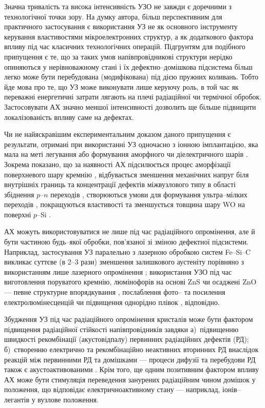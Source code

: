 Значна тривалість та висока інтенсивність УЗО не завжди є доречними з технологічної точки зору.
На думку автора, більш перспективним для практичного застосування є використання УЗ не як основного інструменту керування властивостями мікроелектронних структур, а як додаткового фактора впливу під час класичних технологічних операцій.
Підгрунтям для подібного припущення є те, що за таких умов напівпровідникові структури нерідко опиняються у нерівноважному стані і їх дефектно--домішкова підсистема більш легко може бути перебудована (модифікована) під дією пружних коливань.
Тобто йде мова про те, що УЗ може виконувати лише керуючу роль, в той час як переважні енергетичні затрати
лягають на плечі радіаційної чи термічної обробок.
Застосовувати АХ значно меншої інтенсивності дозволить ще більше підвищити локалізованість впливу саме на дефектах.

Чи не найяскравішим експериментальним доказом даного припущення є результати, отримані при
використанні УЗ одночасно з іонною імплантацією, яка мала на меті легування або формування аморфного чи діелектричного шарів \cite{US:ImplantUFJ2015,US:ImplantUFJ2001,US:ImplantUFJ2008,ROMANYUK2005,Roman2006,RomanyukSST,
YOlikh2005,ROMANJUK2005MatSci,USImplant:JVacSci}.
Зокрема показано, що за наявності АХ
підсилюється процес аморфізації поверхневого шару кремнію \cite{RomanyukSST,US:ImplantUFJ2001},
відбувається зменшення механічних напруг біля внутрішніх границь \cite{US:ImplantUFJ2008,ROMANJUK2005MatSci}
та концентрації дефектів міжвузлового типу в області збіднення $p$--$n$ переходів \cite{YOlikh2005},
створюються умови для формування ультра--мілких переходів \cite{USImplant:JVacSci},
покращуються властивості та зменшується товщина шару WO на поверхні $p$--Si \cite{ROMANYUK2005,Roman2006}.

АХ можуть використовуватися не лише під час радіаційного опромінення, але й бути частиною будь--якої обробки, пов'язаної зі зміною дефектної підсистеми.
Наприклад, застосування УЗ паралельно з лазерною обробкою систем Fe--Si--C викликає суттєве (в 2--3 рази) зменшення залишкового аустеніту порівняно з використанням лише лазерного опромінення \cite{US:FeSiC};
використання УЗО під час виготовлення поруватого кремнію, люмінофорів на основі ZnS чи осаджені ZnO --- певне структурне впорядкування \cite{Kalem2000}, послаблення фото-- та посилення електролюмінесценцій \cite{Wang:JLum} чи підвищення однорідно плівок \cite{US:ZnOfilm}, відповідно.



Збудження УЗ під час радіаційного опромінення кристалів може бути фактором підвищення радіаційної стійкості напівпровідників завдяки
а)~підвищенню швидкості рекомбінації (акустовідпалу) первинних радіаційних дефектів (РД);
б)~створенню електрично та рекомбінаційно неактивних вторинних РД внаслідок реакцій між первинними РД та домішками --- процеси дифузії та перебудови РД також є акустоактивованими \cite{YOlikh2006TPLr,Parchinskii2000r}.
Крім того, ще одним позитивним фактором впливу АХ може бути стимуляція переведення занурених радіаційним чином домішок у положення, що відповідає електричноактивному стану --- наприклад, іонів--легантів у вузлове положення.


